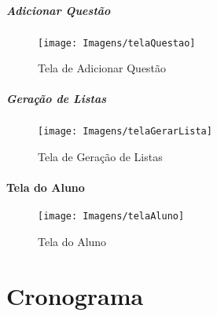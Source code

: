 \documentclass[12pt,oneside,a4paper,article]{abntex2}
\begin{document}
				\pagebreak
				
			\subsubsection{Adicionar Questão}
				\begin{figure}[h]
					\centering
					\texttt{[image: Imagens/telaQuestao]}
					\caption{Tela de Adicionar Questão}
					\label{fig:telaQuestao}
				\end{figure}
				
			\subsubsection{Geração de Listas}
				\begin{figure}[h]
					\centering
					\texttt{[image: Imagens/telaGerarLista]}
					\caption{Tela de Geração de Listas}
					\label{fig:telaGerarLista}
				\end{figure}
				
			\pagebreak
				
		\subsection{Tela do Aluno}
			\begin{figure}[h]
				\centering
				\texttt{[image: Imagens/telaAluno]}
				\caption{Tela do Aluno}
				\label{fig:telaAluno}
			\end{figure}

\part{Cronograma}
\end{document}
